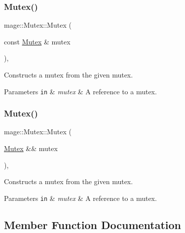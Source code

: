 \subsubsection{\texorpdfstring{Mutex()}{Mutex()}\hspace{0.1cm}{\footnotesize\ttfamily [2/3]}}
{\footnotesize\ttfamily mage\+::\+Mutex\+::\+Mutex (\begin{DoxyParamCaption}\item[{const \hyperlink{classmage_1_1_mutex}{Mutex} \&}]{mutex }\end{DoxyParamCaption})\hspace{0.3cm}{\ttfamily [private]}, {\ttfamily [delete]}}

Constructs a mutex from the given mutex.


\begin{DoxyParams}[1]{Parameters}
\mbox{\tt in}  & {\em mutex} & A reference to a mutex. \\
\hline
\end{DoxyParams}
\hypertarget{classmage_1_1_mutex_a4ec1fd645bcea634f957552d1dfa3565}{}\label{classmage_1_1_mutex_a4ec1fd645bcea634f957552d1dfa3565} 
\subsubsection{\texorpdfstring{Mutex()}{Mutex()}\hspace{0.1cm}{\footnotesize\ttfamily [3/3]}}
{\footnotesize\ttfamily mage\+::\+Mutex\+::\+Mutex (\begin{DoxyParamCaption}\item[{\hyperlink{classmage_1_1_mutex}{Mutex} \&\&}]{mutex }\end{DoxyParamCaption})\hspace{0.3cm}{\ttfamily [private]}, {\ttfamily [delete]}}

Constructs a mutex from the given mutex.


\begin{DoxyParams}[1]{Parameters}
\mbox{\tt in}  & {\em mutex} & A reference to a mutex. \\
\hline
\end{DoxyParams}


\subsection{Member Function Documentation}
\hypertarget{classmage_1_1_mutex_a56072bdabdeadd5d897de232dbd298a0}{}\label{classmage_1_1_mutex_a56072bdabdeadd5d897de232dbd298a0} 
